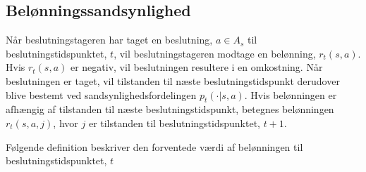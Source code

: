 
\subsection{Belønningssandsynlighed}
Når beslutningstageren har taget en beslutning, $a\in A_{s}$ til beslutningstidspunktet, $t$, vil beslutningstageren modtage en belønning, $r_t(s,a)$. Hvis $r_t(s,a)$ er negativ, vil beslutningen resultere i en omkostning. 
Når beslutningen er taget, vil tilstanden til næste beslutningstidspunkt derudover blive bestemt ved sandsynlighedsfordelingen $p_t(\cdot|s,a)$. 
Hvis belønningen er afhængig af tilstanden til næste beslutningstidspunkt, betegnes belønningen $r_t(s, a, j)$, hvor $j$ er tilstanden til beslutningstidspunktet, $t+1$.






Følgende definition beskriver den forventede værdi af belønningen til beslutningstidspunktet, $t$

